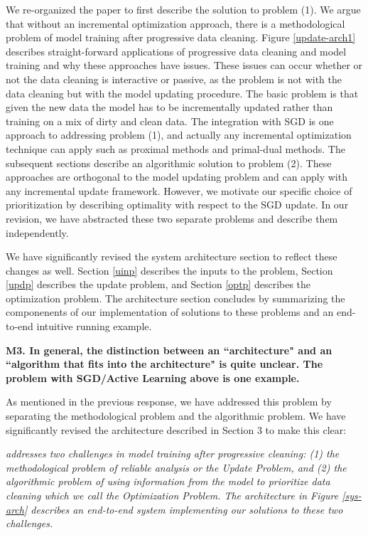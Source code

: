 We re-organized the paper to first describe the solution to problem (1). We argue that without an incremental optimization approach, there is a methodological problem of model training after progressive data cleaning. Figure \ref{update-arch1} describes straight-forward applications of progressive data cleaning and model training and why these approaches have issues.
These issues can occur whether or not the data cleaning is interactive or passive, as the problem is not with the data cleaning but with the model updating procedure.
The basic problem is that given the new data the model has to be incrementally updated rather than training on a mix of dirty and clean data.
The integration with SGD is one approach to addressing problem (1), and actually any incremental optimization technique can apply such as proximal methods and primal-dual methods.
The subsequent sections describe an algorithmic solution to problem (2). These approaches are orthogonal to the model updating problem and can apply with any incremental update framework. However, we motivate our specific choice of prioritization by describing optimality with respect to the SGD update.
In our revision, we have abstracted these two separate problems and describe them independently.

We have significantly revised the system architecture section to reflect these changes as well.
Section \ref{uinp} describes the inputs to the problem, Section \ref{updp} describes the update problem, and Section \ref{optp} describes the optimization problem.
The architecture section concludes by summarizing the componenents of our implementation of solutions to these problems and an end-to-end intuitive running example.

\vspace{0.5em}

\noindent\textbf{M3. In general, the distinction between an ``architecture" and an ``algorithm that fits into the architecture" is quite unclear. The problem with SGD/Active Learning above is one example.}

As mentioned in the previous response, we have addressed this problem by separating the methodological problem and the algorithmic problem. We have significantly revised the architecture described in Section 3 to make this clear:

\emph{\sys addresses two challenges in model training after progressive cleaning: (1) the methodological problem of reliable analysis or the \emph{Update Problem}, and (2) the algorithmic problem of using information from the model to prioritize data cleaning which we call the \emph{Optimization Problem}.
The \sys architecture in Figure \ref{sys-arch} describes an end-to-end system implementing our solutions to these two challenges.}

